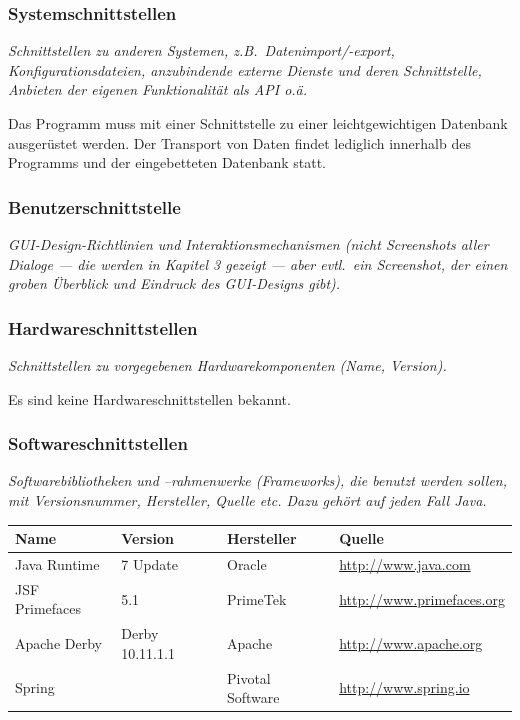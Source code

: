 \documentclass[fontsize=12pt,paper=a4,twoside]{scrartcl}
\begin{document}
  
\subsubsection{Systemschnittstellen}

  {\em Schnittstellen zu anderen Systemen, z.B.\ Datenimport/-export,
  Konfigurationsdateien, anzubindende externe Dienste und deren Schnittstelle,
  Anbieten der eigenen Funktionalität als API o.ä.}


Das Programm muss mit einer Schnittstelle zu einer leichtgewichtigen Datenbank ausgerüstet werden. Der Transport von Daten findet lediglich innerhalb des Programms und der eingebetteten Datenbank statt.
  

\subsubsection{Benutzerschnittstelle}


  {\em GUI-Design-Richtlinien und Interaktionsmechanismen (nicht
  Screenshots aller Dialoge --- die werden in Kapitel 3 gezeigt --- aber
  evtl.\ ein Screenshot, der einen groben Überblick und Eindruck des
  GUI-Designs gibt).}



\subsubsection{Hardwareschnittstellen}


  {\em Schnittstellen zu vorgegebenen Hardwarekomponenten (Name,
  Version).}

Es sind keine Hardwareschnittstellen bekannt.
 

\subsubsection{Softwareschnittstellen}


{\em Softwarebibliotheken und --rahmenwerke (Frameworks), die benutzt
  werden sollen, mit Versionsnummer, Hersteller, Quelle etc. Dazu
  gehört auf jeden Fall Java.}

  \begin{tabular}{|l|l|l|l|}\hline
    \textbf{Name} & \textbf{Version} & \textbf{Hersteller} & \textbf{Quelle} \\\hline
    Java Runtime & 7 Update  & Oracle & \url{http://www.java.com} \\\hline
    JSF Primefaces & 5.1 & PrimeTek &  
   \url{http://www.primefaces.org}\\\hline
    Apache Derby & Derby 10.11.1.1 & Apache & \url{http://www.apache.org} \\\hline
    Spring & & Pivotal Software & \url{http://www.spring.io}\\\hline
  \end{tabular}
\end{document}
